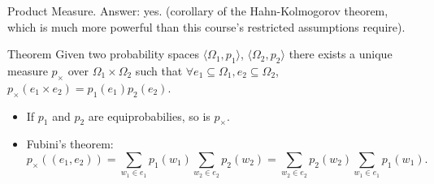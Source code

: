 \documentclass{beamer}
\begin{document}
\begin{frame}{Product Measure.}
  Answer: yes. (corollary of the Hahn-Kolmogorov theorem, which is much more powerful than this course's restricted assumptions require).
  
  \begin{block}{Theorem}
    Given two probability spaces $\langle \Omega_1, p_1 \rangle$, $\langle \Omega_2, p_2 \rangle$ there exists a unique measure $p_{{\times}}$ over $\Omega_1 \times \Omega_2$ such that $\forall e_1 \subseteq \Omega_1, e_2 \subseteq \Omega_2$, $p_{\times}(e_1 \times e_2) = p_1(e_1)p_2(e_2)$.
  \end{block}

  \begin{itemize}
  \item If $p_1$ and $p_2$ are equiprobabilies, so is $p_{\times}$.
  \item Fubini's theorem:
    \[p_{\times}((e_1, e_2)) = \sum_{w_1 \in e_1} p_1(w_1)  \sum_{w_2 \in e_2} p_{2}(w_2) = \sum_{w_2 \in e_2} p_2(w_2) \sum_{w_1 \in e_1} p_1(w_1). \]
  \end{itemize}
\end{frame}
\end{document}
